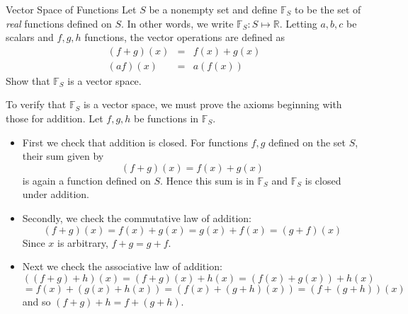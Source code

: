 \begin{example}{Vector Space of Functions}\label{exa:vectorspacefunction}
Let $S$ be a nonempty set and define $\mathbb{F}_S$ to be the set of \textit{real} functions
defined on $S$. In other words, we write $\mathbb{F}_S: S \mapsto \mathbb{R}$. Letting $a,b,c$ be scalars and $f,g,h$ functions, the
vector operations are defined as
\begin{eqnarray*}
\left( f+g\right) \left( x\right)  &=&f\left( x\right) +g\left(
x\right)  \\
\left( af\right) \left( x\right)  &=&a\left( f\left( x\right) \right)
\end{eqnarray*}
Show that $\mathbb{F}_S$ is a vector space. 
\end{example}

\begin{solution}
To verify that $\mathbb{F}_S$ is a vector space, we must prove the axioms beginning with those for addition. Let $f, g, h$ be functions in $\mathbb{F}_S$. 

\begin{itemize}
\item
First we check that addition is closed.  For functions $f, g$ defined on the set $S$, their sum given by 
\[
(f+g)(x) = f(x)+g(x)
\]
is again a function defined on $S$. Hence this sum is in $\mathbb{F}_S$ and $\mathbb{F}_S$ is closed under addition. 

\item
Secondly, we check the commutative law of addition:
\begin{equation*}
\left( f+g\right) \left( x\right) =f\left( x\right) +g\left( x\right)
=g\left( x\right) +f\left( x\right) =\left( g+f\right) \left( x\right)
\end{equation*}
Since $x$ is arbitrary, $f+g=g+f$.

\item
Next we check the associative law of addition:
\begin{equation*}
\left( \left( f+g\right) +h\right) \left( x\right) = \left( f+g\right)
\left( x\right) +h\left( x\right) =\left( f\left( x\right) +g\left( x\right)
\right) +h\left( x\right)
\end{equation*}
\begin{equation*}
=f\left( x\right) +\left( g\left( x\right) +h\left( x\right) \right) =\left(
f\left( x\right) +\left( g+h\right) \left( x\right) \right) =\left( f+\left(
g+h\right) \right) \left( x\right)
\end{equation*}
and so $\left( f+g\right) +h=f+\left( g+h\right) .$


\end{itemize}
\end{solution}
